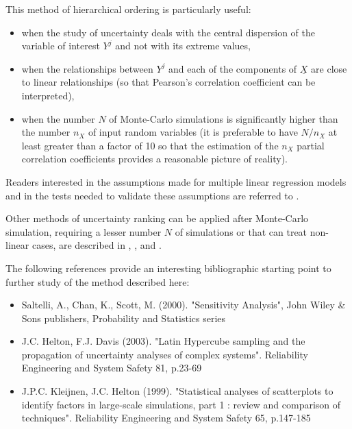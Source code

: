 {
  This method of hierarchical ordering is particularly useful:
  \begin{itemize}
  \item when the study of uncertainty deals with the central dispersion of the variable of interest $Y^j$ and not with its extreme values,
  \item when the relationships between $Y^j$ and each of the components of $\underline{X}$ are close to linear relationships (so that Pearson's correlation coefficient can be interpreted),
  \item when the number $N$ of Monte-Carlo simulations is significantly higher than the number $n_X$ of input random variables (it is preferable to have $N/n_X$ at least greater than a factor of 10 so that the estimation of the $n_X$ partial correlation coefficients provides a reasonable picture of reality).
  \end{itemize}

  Readers interested in the assumptions made for multiple linear regression models and in the tests needed to validate these assumptions are referred to .

  Other methods of uncertainty ranking can be applied after Monte-Carlo simulation, requiring a lesser number $N$ of simulations or that can treat non-linear cases, are described in , , and .

  The following references provide an interesting bibliographic starting point to further study of the method described here:
  \begin{itemize}
  \item Saltelli, A., Chan, K., Scott, M. (2000). "Sensitivity Analysis", John Wiley \& Sons publishers, Probability and Statistics series
  \item J.C. Helton, F.J. Davis (2003). "Latin Hypercube sampling and the propagation of uncertainty analyses of complex systems". Reliability Engineering and System Safety 81, p.23-69
  \item J.P.C. Kleijnen, J.C. Helton (1999). "Statistical analyses of scatterplots to identify factors in large-scale simulations, part 1 : review and comparison of techniques". Reliability Engineering and System Safety 65, p.147-185
  \end{itemize}
}
